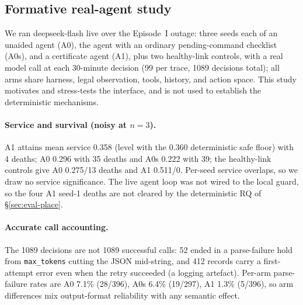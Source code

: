 \documentclass[11pt]{article}
\begin{document}
\subsection{Formative real-agent study}
\label{sec:eval-agent}
We ran deepseek-flash live over the Episode~I outage: three seeds each of an unaided agent (A0),
the agent with an ordinary pending-command checklist (A0s), and a certificate agent (A1), plus two
healthy-link controls, with a real model call at each 30-minute decision (99 per trace, 1089
decisions total); all arms share harness, legal observation, tools, history, and action space.
This study motivates and stress-tests the interface, and is not used to establish the deterministic
mechanisms.

\paragraph{Service and survival (noisy at $n{=}3$).} A1 attains mean service 0.358 (level with the
0.360 deterministic safe floor) with 4 deaths; A0 0.296 with 35 deaths and A0s 0.222 with 39; the
healthy-link controls give A0 0.275/13 deaths and A1 0.511/0. Per-seed service overlaps, so we draw
no service significance. The live agent loop was not wired to the local guard, so the four A1
seed-1 deaths are not cleared by the deterministic RQ of \S\ref{sec:eval-place}.

\paragraph{Accurate call accounting.} The 1089 decisions are not 1089 successful calls: 52 ended
in a parse-failure hold from \texttt{max\_tokens} cutting the JSON mid-string, and 412 records
carry a first-attempt error even when the retry succeeded (a logging artefact). Per-arm
parse-failure rates are A0 7.1\% (28/396), A0s 6.4\% (19/297), A1 1.3\% (5/396), so arm
differences mix output-format reliability with any semantic effect.
\end{document}
